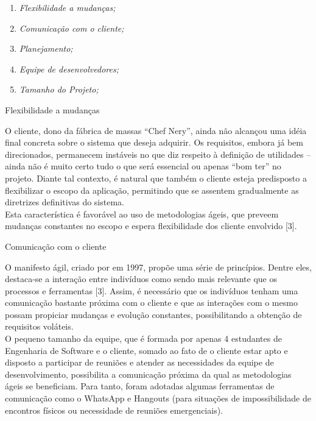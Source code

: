 \begin{enumerate}
	\item \textsl{Flexibilidade a mudanças;} 
	\item \textsl{Comunicação com o cliente;}
	\item \textsl{Planejamento;} 
	\item \textsl{Equipe de desenvolvedores;}
	\item \textsl{Tamanho do Projeto;}
\end{enumerate}


{
	\large{Flexibilidade a mudanças\\}

	\tab O cliente, dono da fábrica de massas “Chef Nery”, ainda não alcançou uma idéia final concreta sobre o sistema que deseja adquirir. Os requisitos, embora já bem direcionados, permanecem instáveis no que diz respeito à definição de utilidades – ainda não é muito certo tudo o que será essencial ou apenas “bom ter” no projeto. Diante tal contexto, é natural que também o cliente esteja predisposto a flexibilizar o escopo da aplicação, permitindo que se assentem gradualmente as diretrizes definitivas do sistema. \\
	\tab Esta característica é favorável ao uso de metodologias ágeis, que preveem mudanças constantes no escopo e espera flexibilidade dos cliente envolvido [3]. \\
}

{
	\large{Comunicação com o cliente\\}

	\tab O manifesto ágil, criado por  em 1997, propõe uma série de princípios. Dentre eles, destaca-se a interação entre indivíduos como sendo mais relevante que os processos e ferramentas  [3]. Assim,  é necessário que os indivíduos tenham uma comunicação bastante próxima  com o cliente e que as interações com o mesmo possam propiciar mudanças e evolução constantes, possibilitando  a obtenção de requisitos voláteis. \\
	\tab O pequeno tamanho da equipe, que é formada por apenas 4 estudantes de Engenharia de Software e o cliente, somado ao fato de o cliente estar apto e disposto a participar de reuniões e atender as necessidades da equipe de desenvolvimento, possibilita a comunicação próxima da qual as metodologias ágeis se beneficiam. Para tanto, foram adotadas algumas ferramentas de comunicação como o WhatsApp e Hangouts (para situações de impossibilidade de encontros físicos ou necessidade de reuniões emergenciais). \\

}
	
